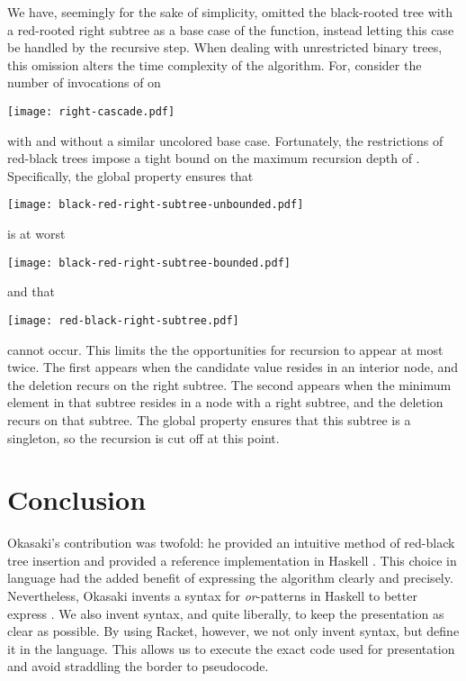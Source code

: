 \documentclass[preprint]{sigplanconf}
\begin{document}
We have, seemingly for the sake of simplicity, omitted the black-rooted tree with a red-rooted right subtree as a base case of the  function, instead letting this case be handled by the recursive step. When dealing with unrestricted binary trees, this omission alters the time complexity of the algorithm. For, consider the number of invocations of  on
\begin{center}
\texttt{[image: right-cascade.pdf]}
\end{center}
with and without a similar uncolored base case. Fortunately, the restrictions of red-black trees impose a tight bound on the maximum recursion depth of . Specifically, the global property ensures that
\begin{center}
\texttt{[image: black-red-right-subtree-unbounded.pdf]}
\end{center}
is at worst
\begin{center}
\texttt{[image: black-red-right-subtree-bounded.pdf]}
\end{center}
and that
\begin{center}
\texttt{[image: red-black-right-subtree.pdf]}
\end{center}
cannot occur. This limits the the opportunities for recursion to appear at most twice. The first appears when the candidate value resides in an interior node, and the deletion recurs on the right subtree. The second appears when the minimum element in that subtree resides in a node with a right subtree, and the deletion recurs on that subtree. The global property ensures that this subtree is a singleton, so the recursion is cut off at this point.

\section{Conclusion}

Okasaki's contribution was twofold: he provided an intuitive method of red-black tree insertion and provided a reference implementation in Haskell \cite{hudak1992report}. This choice in language had the added benefit of expressing the algorithm clearly and precisely. Nevertheless, Okasaki invents a syntax for \emph{or}-patterns in Haskell to better express . We also invent syntax, and quite liberally, to keep the presentation as clear as possible. By using Racket, however, we not only invent syntax, but define it in the language. This allows us to execute the exact code used for presentation and avoid straddling the border to pseudocode.










\end{document}
